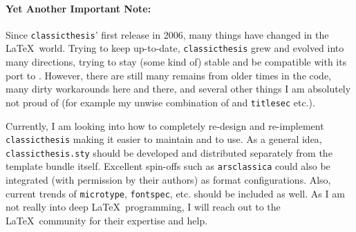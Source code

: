 \paragraph{Yet Another Important Note:} Since \texttt{classicthesis}'
first release in 2006, many things have changed in the \LaTeX\ world.
Trying to keep up-to-date, \texttt{classicthesis} grew and evolved
into many directions, trying to stay (some kind of) stable and be
compatible with its port to \mLyX. However, there are still many
remains from older times in the code, many dirty workarounds here and
there, and several other things I am absolutely not proud of (for
example my unwise combination of  and
\texttt{titlesec} etc.).

Currently, I am looking into how to completely re-design and
re-implement \texttt{classicthesis} making it easier to maintain and
to use. As a general idea, \texttt{classicthesis.sty} should be
developed and distributed separately from the template bundle itself.
Excellent spin-offs such as \texttt{arsclassica} could also be
integrated (with permission by their authors) as format configurations.
Also, current trends of \texttt{microtype}, \texttt{fontspec}, etc.
should be included as well. As I am not really into deep
\LaTeX\ programming,
I will reach out to the \LaTeX\ community for their expertise and help.


